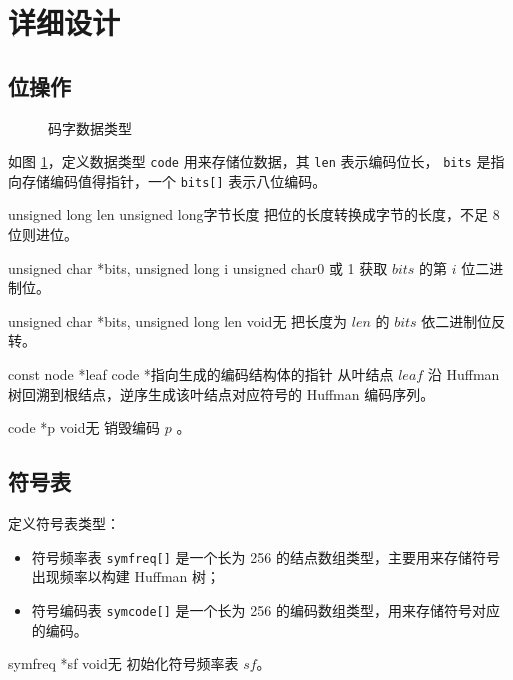 
\section{详细设计}

\subsection{位操作}

\begin{figure}[htp]
\centering
{}
\caption{\label{code}码字数据类型}
\end{figure}

如图 \ref{code}，定义数据类型 \verb|code| 用来存储位数据，其 \verb|len| 表示编码位长， \verb|bits| 是指向存储编码值得指针，一个 \verb|bits[]| 表示八位编码。

{unsigned long len}
{unsigned long}{字节长度}
{把位的长度转换成字节的长度，不足 8 位则进位。}

{unsigned char *bits, unsigned long i}
{unsigned char}{0 或 1}
{获取 $bits$ 的第 $i$ 位二进制位。}

{unsigned char *bits, unsigned long len}
{void}{无}
{把长度为 $len$ 的 $bits$ 依二进制位反转。}

{const node *leaf}
{code *}{指向生成的编码结构体的指针}
{从叶结点 $leaf$ 沿 Huffman 树回溯到根结点，逆序生成该叶结点对应符号的 Huffman 编码序列。}

{code *p}
{void}{无}
{销毁编码 $p$ 。}

\subsection{符号表}

定义符号表类型：
\begin{itemize}[topsep=0pt,partopsep=0pt,itemsep=0pt,parsep=0pt]
\item 符号频率表 \verb|symfreq[]| 是一个长为 256 的结点数组类型，主要用来存储符号出现频率以构建 Huffman 树；
\item 符号编码表 \verb|symcode[]| 是一个长为 256 的编码数组类型，用来存储符号对应的编码。
\end{itemize}

{symfreq *sf}
{void}{无}
{初始化符号频率表 $sf$。}

